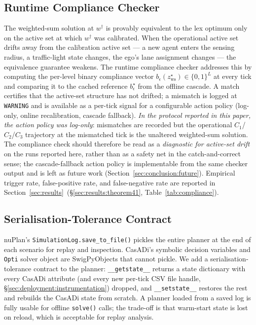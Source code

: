 \subsection{Runtime Compliance Checker}
\label{sec:deployment:compliance}

The weighted-sum solution at $w^{\dagger}$ is provably equivalent to the lex optimum only on the active set at which $w^{\dagger}$ was calibrated. When the operational active set drifts away from the calibration active set --- a new agent enters the sensing radius, a traffic-light state changes, the ego's lane assignment changes --- the equivalence guarantee weakens. The runtime compliance checker addresses this by computing the per-level binary compliance vector $b_{\epsilon}(z_{\mathrm{ws}}^{\star}) \in \{0,1\}^{L}$ at every tick and comparing it to the cached reference $b_{\epsilon}^{\star}$ from the offline cascade. A match certifies that the active-set structure has not drifted; a mismatch is logged at \texttt{WARNING} and is available as a per-tick signal for a configurable action policy (log-only, online recalibration, cascade fallback). \emph{In the protocol reported in this paper, the action policy was log-only}: mismatches are recorded but the operational $C_1$/$C_2$/$C_3$ trajectory at the mismatched tick is the unaltered weighted-sum solution. The compliance check should therefore be read as a \emph{diagnostic for active-set drift} on the runs reported here, rather than as a safety net in the catch-and-correct sense; the cascade-fallback action policy is implementable from the same checker output and is left as future work (Section~\ref{sec:conclusion:future}). Empirical trigger rate, false-positive rate, and false-negative rate are reported in Section~\ref{sec:results}~(\S\ref{sec:results:theorem41}, Table~\ref{tab:compliance}).

\subsection{Serialisation-Tolerance Contract}
\label{sec:deployment:serialisation}

nuPlan's \texttt{SimulationLog.save\_to\_file()} pickles the entire planner at the end of each scenario for replay and inspection. CasADi's symbolic decision variables and \texttt{Opti} solver object are SwigPyObjects that cannot pickle. We add a serialisation-tolerance contract to the planner: \texttt{\_\_getstate\_\_} returns a state dictionary with every CasADi attribute (and every new per-tick CSV file handle, \S\ref{sec:deployment:instrumentation}) dropped, and \texttt{\_\_setstate\_\_} restores the rest and rebuilds the CasADi state from scratch. A planner loaded from a saved log is fully usable for offline \texttt{solve()} calls; the trade-off is that warm-start state is lost on reload, which is acceptable for replay analysis.

